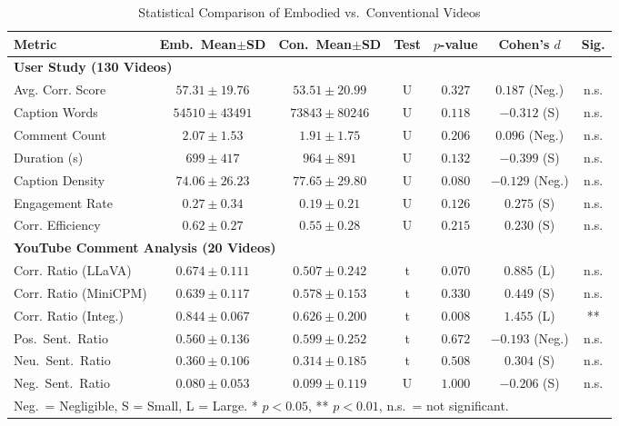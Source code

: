 \documentclass[12pt]{article}
\begin{document}
\begin{table}[H]
    \centering
    \caption{Statistical Comparison of Embodied vs.\ Conventional Videos}
    \label{tab:stat_tests}
    \scriptsize
    \begin{tabular}{l c c c c c c}
        \toprule
        \textbf{Metric} & \textbf{Emb.\ Mean$\pm$SD} & \textbf{Con.\ Mean$\pm$SD} & \textbf{Test} & \textbf{$p$-value} & \textbf{Cohen's $d$} & \textbf{Sig.} \\
        \midrule
        \multicolumn{7}{l}{\textbf{User Study (130 Videos)}} \\
        \midrule
        Avg. Corr. Score & $57.31 \pm 19.76$ & $53.51 \pm 20.99$ & U & $0.327$ & $0.187$ (Neg.) & n.s. \\
        Caption Words & $54510 \pm 43491$ & $73843 \pm 80246$ & U & $0.118$ & $-0.312$ (S) & n.s. \\
        Comment Count & $2.07 \pm 1.53$ & $1.91 \pm 1.75$ & U & $0.206$ & $0.096$ (Neg.) & n.s. \\
        Duration (s) & $699 \pm 417$ & $964 \pm 891$ & U & $0.132$ & $-0.399$ (S) & n.s. \\
        Caption Density & $74.06 \pm 26.23$ & $77.65 \pm 29.80$ & U & $0.080$ & $-0.129$ (Neg.) & n.s. \\
        Engagement Rate & $0.27 \pm 0.34$ & $0.19 \pm 0.21$ & U & $0.126$ & $0.275$ (S) & n.s. \\
        Corr. Efficiency & $0.62 \pm 0.27$ & $0.55 \pm 0.28$ & U & $0.215$ & $0.230$ (S) & n.s. \\
        \midrule
        \multicolumn{7}{l}{\textbf{YouTube Comment Analysis (20 Videos)}} \\
        \midrule
        Corr. Ratio (LLaVA) & $0.674 \pm 0.111$ & $0.507 \pm 0.242$ & t & $0.070$ & $0.885$ (L) & n.s. \\
        Corr. Ratio (MiniCPM) & $0.639 \pm 0.117$ & $0.578 \pm 0.153$ & t & $0.330$ & $0.449$ (S) & n.s. \\
        Corr. Ratio (Integ.) & $0.844 \pm 0.067$ & $0.626 \pm 0.200$ & t & $0.008$ & $1.455$ (L) & ** \\
        Pos.\ Sent.\ Ratio & $0.560 \pm 0.136$ & $0.599 \pm 0.252$ & t & $0.672$ & $-0.193$ (Neg.) & n.s. \\
        Neu.\ Sent.\ Ratio & $0.360 \pm 0.106$ & $0.314 \pm 0.185$ & t & $0.508$ & $0.304$ (S) & n.s. \\
        Neg.\ Sent.\ Ratio & $0.080 \pm 0.053$ & $0.099 \pm 0.119$ & U & $1.000$ & $-0.206$ (S) & n.s. \\
        \bottomrule
        \multicolumn{7}{l}{\scriptsize Neg.\ = Negligible, S = Small, L = Large. * $p<0.05$, ** $p<0.01$, n.s.\ = not significant.}
    \end{tabular}
\end{table}
\end{document}
